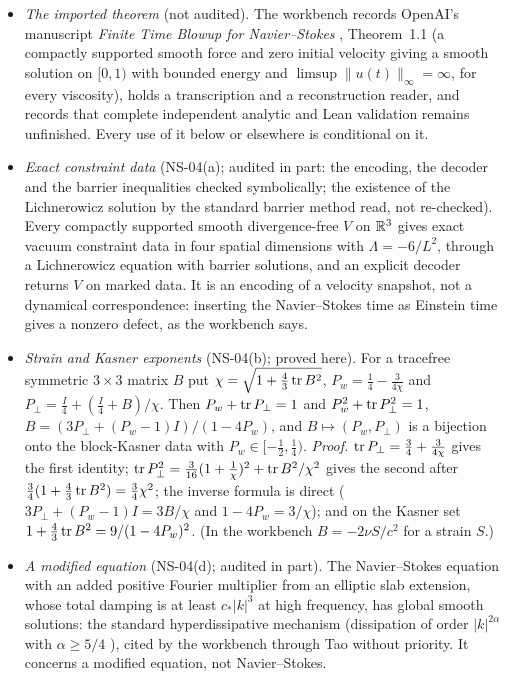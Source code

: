 \begin{itemize}
\item \emph{The imported theorem} (not audited). The workbench records OpenAI's manuscript \emph{Finite Time Blowup for Navier--Stokes} \cite{OpenAINS}, Theorem~1.1 (a compactly supported smooth force and zero initial velocity giving a smooth solution on $[0,1)$ with bounded energy and $\limsup\|u(t)\|_\infty=\infty$, for every viscosity), holds a transcription and a reconstruction reader, and records that complete independent analytic and Lean validation remains unfinished. Every use of it below or elsewhere is conditional on it.
\item \emph{Exact constraint data} (NS-04(a); audited in part: the encoding, the decoder and the barrier inequalities checked symbolically; the existence of the Lichnerowicz solution by the standard barrier method read, not re-checked). Every compactly supported smooth divergence-free $V$ on $\mathbb{R}^3$ gives exact vacuum constraint data in four spatial dimensions with $\Lambda=-6/L^2$, through a Lichnerowicz equation with barrier solutions, and an explicit decoder returns $V$ on marked data. It is an encoding of a velocity snapshot, not a dynamical correspondence: inserting the Navier--Stokes time as Einstein time gives a nonzero defect, as the workbench says.
\item \emph{Strain and Kasner exponents} (NS-04(b); proved here). For a tracefree symmetric $3\times3$ matrix $B$ put $\chi=\sqrt{1+\frac43\operatorname{tr} B^2}$, $P_w=\frac14-\frac3{4\chi}$ and $P_\perp=\frac I4+(\frac I4+B)/\chi$. Then $P_w+\operatorname{tr} P_\perp=1$ and $P_w^2+\operatorname{tr} P_\perp^2=1$, $B=(3P_\perp+(P_w-1)I)/(1-4P_w)$, and $B\mapsto(P_w,P_\perp)$ is a bijection onto the block-Kasner data with $P_w\in[-\frac12,\frac14)$. \emph{Proof.} $\operatorname{tr} P_\perp=\frac34+\frac3{4\chi}$ gives the first identity; $\operatorname{tr} P_\perp^2=\frac3{16}(1+\frac1\chi)^2+\operatorname{tr} B^2/\chi^2$ gives the second after $\frac34(1+\frac43\operatorname{tr} B^2)=\frac34\chi^2$; the inverse formula is direct ($3P_\perp+(P_w-1)I=3B/\chi$ and $1-4P_w=3/\chi$); and on the Kasner set $1+\frac43\operatorname{tr} B^2=9/(1-4P_w)^2$. (In the workbench $B=-2\nu S/c^2$ for a strain $S$.)
\item \emph{A modified equation} (NS-04(d); audited in part). The Navier--Stokes equation with an added positive Fourier multiplier from an elliptic slab extension, whose total damping is at least $c_*|k|^3$ at high frequency, has global smooth solutions: the standard hyperdissipative mechanism (dissipation of order $|k|^{2\alpha}$ with $\alpha\ge5/4$ \cite{Lions}), cited by the workbench through Tao \cite{TaoHyper} without priority. It concerns a modified equation, not Navier--Stokes.
\end{itemize}

